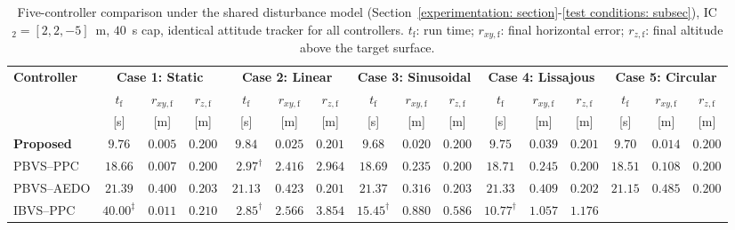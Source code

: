\documentclass{IEEEtaes}
\theoremstyle{definition}
\theoremstyle{remark}
\begin{document}
\begin{table}[!t]
\centering
\caption{Five-controller comparison under the shared disturbance model (Section~\ref{experimentation: section}-\ref{test conditions: subsec}), IC$_2=[2,2,-5]$~m, $40$~s cap, identical attitude tracker for all controllers. $t_\text{f}$: run time; $r_{xy,\text{f}}$: final horizontal error; $r_{z,\text{f}}$: final altitude above the target surface.}
\label{comparison: table}
\footnotesize
\setlength{\tabcolsep}{3.5pt}
\begin{threeparttable}
\begin{tabular}{lccc@{\hskip 6pt}ccc@{\hskip 6pt}ccc@{\hskip 6pt}ccc@{\hskip 6pt}ccc}
\toprule
\multirow{3}{*}{\textbf{Controller}}
    & \multicolumn{3}{c}{\textbf{Case 1: Static}}
    & \multicolumn{3}{c}{\textbf{Case 2: Linear}}
    & \multicolumn{3}{c}{\textbf{Case 3: Sinusoidal}}
    & \multicolumn{3}{c}{\textbf{Case 4: Lissajous}}
    & \multicolumn{3}{c}{\textbf{Case 5: Circular}} \\
\cmidrule(lr){2-4}\cmidrule(lr){5-7}\cmidrule(lr){8-10}\cmidrule(lr){11-13}\cmidrule(lr){14-16}
    & $t_\text{f}$ & $r_{xy,\text{f}}$ & $r_{z,\text{f}}$
    & $t_\text{f}$ & $r_{xy,\text{f}}$ & $r_{z,\text{f}}$
    & $t_\text{f}$ & $r_{xy,\text{f}}$ & $r_{z,\text{f}}$
    & $t_\text{f}$ & $r_{xy,\text{f}}$ & $r_{z,\text{f}}$
    & $t_\text{f}$ & $r_{xy,\text{f}}$ & $r_{z,\text{f}}$ \\
    & [s] & [m] & [m]
    & [s] & [m] & [m]
    & [s] & [m] & [m]
    & [s] & [m] & [m]
    & [s] & [m] & [m] \\
\midrule
\textbf{Proposed}
    & $\mathbf{9.76}$ & $\mathbf{0.005}$ & $0.200$
    & $\mathbf{9.84}$ & $\mathbf{0.025}$ & $0.201$
    & $\mathbf{9.68}$ & $\mathbf{0.020}$ & $0.200$
    & $\mathbf{9.75}$ & $\mathbf{0.039}$ & $0.201$
    & $\mathbf{9.70}$ & $\mathbf{0.014}$ & $0.200$ \\
PBVS--PPC \cite{lin2022}
    & $18.66$ & $0.007$ & $0.200$
    & $\phantom{0}2.97^\dagger$ & $2.416$ & $2.964$
    & $18.69$ & $0.235$ & $0.200$
    & $18.71$ & $0.245$ & $0.200$
    & $18.51$ & $0.108$ & $0.200$ \\
PBVS--AEDO \cite{zhang2026}
    & $21.39$ & $0.400$ & $0.203$
    & $21.13$ & $0.423$ & $0.201$
    & $21.37$ & $0.316$ & $0.203$
    & $21.33$ & $0.409$ & $0.202$
    & $21.15$ & $0.485$ & $0.200$ \\
IBVS--PPC \cite{lin2023}
    & $40.00^\ddagger$ & $0.011$ & $0.210$
    & $\phantom{0}2.85^\dagger$ & $2.566$ & $3.854$
    & $15.45^\dagger$ & $0.880$ & $0.586$
    & $10.77^\dagger$ & $1.057$ & $1.176$

\end{tabular}
\end{threeparttable}
\end{table}
\end{document}
